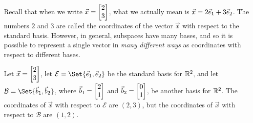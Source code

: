 
Recall that when we write $\vec x=\mat{2\\3}$, what we actually mean is $\vec x=2{\vec e_1}+3{\vec e_2}$. The numbers $2$
and $3$ are called the coordinates of the vector $\vec x$ with respect to the standard basis.  However, in general,
subspaces have many bases, and so it is possible to represent a single vector in \emph{many different ways}
as coordinates with respect to different bases.

\medskip
Let $\vec x=\mat{2\\3}$, let $\mathcal E=\Set{\xhat,\yhat}$ be the standard basis for $\mathbb{R}^2$, and let
$\mathcal B=\Set{\vec b_1,\vec b_2}$, where $\vec b_1=\mat{2\\1}$ and $\vec b_2=\mat{0\\1}$, be another
basis for $\mathbb{R}^2$. The coordinates of $\vec x$ with respect to $\mathcal E$ are $(2,3)$, but
the coordinates of $\vec x$ with respect to $\mathcal B$ are $(1,2)$.

